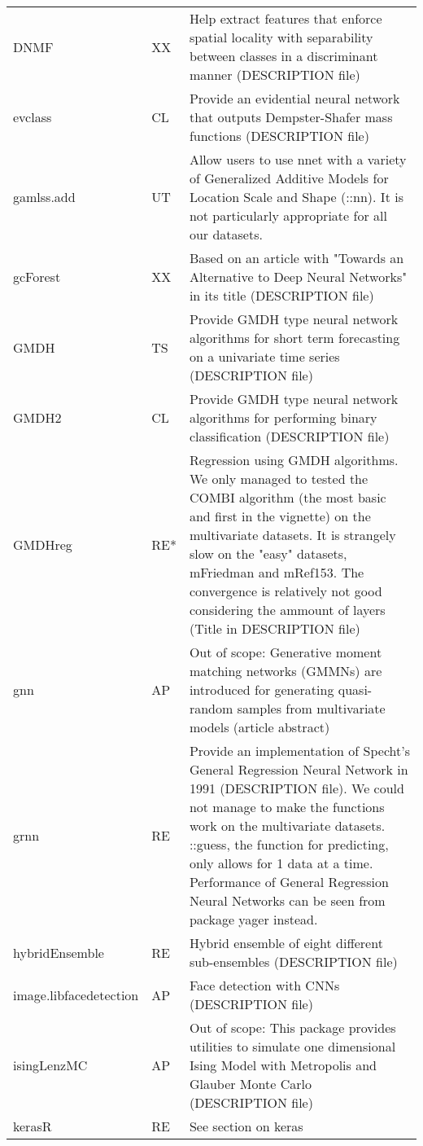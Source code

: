 \begin{Schunk}
\begin{longtable}[t]{ll>{\raggedright\arraybackslash}p{10cm}}
\addlinespace
DNMF & XX & Help extract features that enforce spatial locality with separability between classes in a discriminant manner (DESCRIPTION file)\\
evclass & CL & Provide an evidential neural network that outputs Dempster-Shafer mass functions (DESCRIPTION file)\\
gamlss.add & UT & Allow users to use nnet with a variety of Generalized Additive Models for Location Scale and Shape (::nn). It is not particularly appropriate for all our datasets.\\
gcForest & XX & Based on an article with "Towards an Alternative to Deep Neural Networks" in its title (DESCRIPTION file)\\
GMDH & TS & Provide GMDH type neural network algorithms for short term forecasting on a univariate time series (DESCRIPTION file)\\
\addlinespace
GMDH2 & CL & Provide GMDH type neural network algorithms for performing binary classification (DESCRIPTION file)\\
GMDHreg & RE* & Regression using GMDH algorithms. We only managed to tested the COMBI algorithm (the most basic and first in the vignette) on the multivariate datasets. It is strangely slow on the "easy" datasets, mFriedman and mRef153. The convergence is relatively not good considering the ammount of layers (Title in DESCRIPTION file)\\
gnn & AP & Out of scope: Generative moment matching networks (GMMNs) are introduced for generating quasi-random samples from multivariate models (article abstract)\\
grnn & RE & Provide an implementation of Specht's General Regression Neural Network in 1991 (DESCRIPTION file). We could not manage to make the functions work on the multivariate datasets. ::guess, the function for predicting, only allows for 1 data at a time. Performance of General Regression Neural Networks can be seen from package yager instead.\\
hybridEnsemble & RE & Hybrid ensemble of eight different sub-ensembles (DESCRIPTION file)\\
\addlinespace
image.libfacedetection & AP & Face detection with CNNs (DESCRIPTION file)\\
isingLenzMC & AP & Out of scope: This package provides utilities to simulate one dimensional Ising Model with Metropolis and Glauber Monte Carlo (DESCRIPTION file)\\
kerasR & RE & See section on keras\\

\end{longtable}
\end{Schunk}
